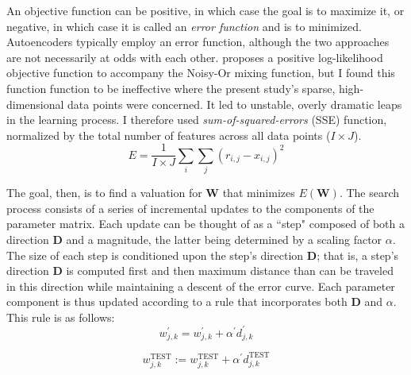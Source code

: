 An objective function can be positive, in which case the goal is to maximize it, or negative, 
in which case it is
called an \emph{error function} and is to minimized. Autoencoders typically 
employ an error function, although the two approaches are not necessarily at odds 
with each other. \citet{saund:94} proposes a positive log-likelihood objective function 
to accompany the Noisy-Or mixing function, but I found this function function to be 
ineffective where the present study's sparse, high-dimensional data points were concerned. 
It led to unstable, overly dramatic leaps in the learning process. 
I therefore used \emph{sum-of-squared-errors} (SSE)  function, normalized 
by the total number of features across
all data points ($I \times J$).
\begin{equation} \label{eq:sse}
E = \frac{1}{I \times J} \sum_{i} \sum_{j} {(r_{i,j} - x_{i,j})}^2
\end{equation}
 
The goal, then, is to find a valuation for $\mathbf{W}$ that minimizes $E(\mathbf{W})$. 
The search process consists of a series of incremental updates to the 
components of the parameter matrix. Each update can be thought of 
as a ``step" composed of both a direction $\textbf{D}$ and a magnitude, 
the latter being determined by a scaling factor $\alpha$. 
The size of each step is conditioned upon the step's direction $\textbf{D}$; that is, a step's direction $\textbf{D}$ is computed first and then maximum distance than can be traveled in this direction while maintaining a descent of the error curve. 
Each parameter component is thus updated according to a rule that incorporates both $\textbf{D}$ and $\alpha$. This rule is as follows:
\begin{equation}\label{eq:gen-update-01}
w^{\prime}_{j,k} = w^{\prime}_{j,k} + \alpha^{\prime} d^{\prime}_{j,k}
\end{equation}

\begin{equation}\label{eq:gen-update-02}
w^{\text{TEST}}_{j,k} := w^{\text{TEST}}_{j,k} + \alpha^{\prime} d^{\text{TEST}}_{j,k}
\end{equation}

